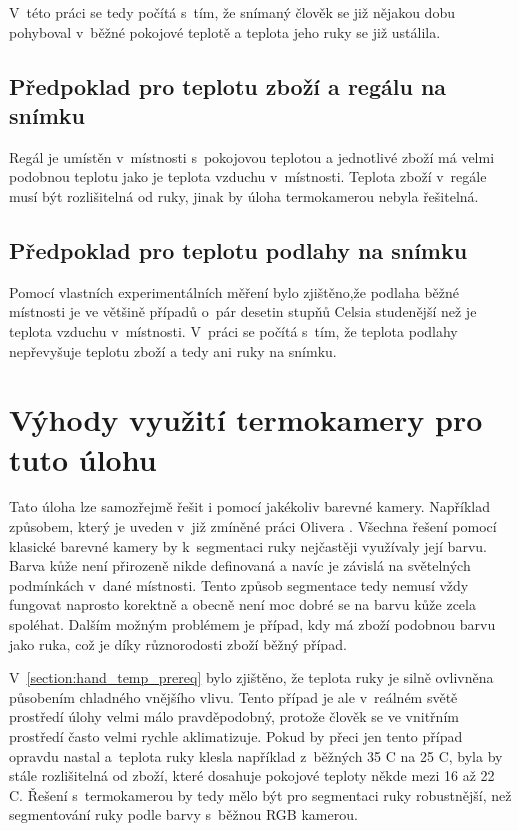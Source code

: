     V~této práci se tedy počítá s~tím, že snímaný člověk se již nějakou dobu pohyboval v~běžné pokojové teplotě a teplota jeho ruky se již ustálila.
    
    \subsection{Předpoklad pro teplotu zboží a regálu na snímku}
    Regál je umístěn v~místnosti s~pokojovou teplotou a jednotlivé zboží má velmi podobnou teplotu jako je teplota vzduchu v~místnosti. Teplota zboží v~regále musí být rozlišitelná od ruky, jinak by úloha termokamerou nebyla řešitelná.
    
    \subsection{Předpoklad pro teplotu podlahy na snímku}
    Pomocí vlastních experimentálních měření bylo zjištěno,že podlaha běžné místnosti je ve většině případů o~pár desetin stupňů Celsia studenější než je teplota vzduchu v~místnosti. V~práci se počítá s~tím, že teplota podlahy nepřevyšuje teplotu zboží a tedy ani ruky na snímku.
    
\section{Výhody využití termokamery pro tuto úlohu}
Tato úloha lze samozřejmě řešit i pomocí jakékoliv barevné kamery. Například způsobem, který je uveden v~již zmíněné práci Olivera \cite{kerul2016detekce}. Všechna řešení pomocí klasické barevné kamery by k~segmentaci ruky nejčastěji využívaly její barvu. Barva kůže není přirozeně nikde definovaná a navíc je závislá na světelných podmínkách v~dané místnosti. Tento způsob segmentace tedy nemusí vždy fungovat naprosto korektně a obecně není moc dobré se na barvu kůže zcela spoléhat. Dalším možným problémem je případ, kdy má zboží podobnou barvu jako ruka, což je díky různorodosti zboží běžný případ. 

V~\ref{section:hand_temp_prereq} bylo zjištěno, že teplota ruky je silně ovlivněna působením chladného vnějšího vlivu. Tento případ je ale v~reálném světě prostředí úlohy velmi málo pravděpodobný, protože člověk se ve vnitřním prostředí často velmi rychle aklimatizuje. Pokud by přeci jen tento případ opravdu nastal a~teplota ruky klesla například z~běžných 35 \textdegree{}C na 25 \textdegree{}C, byla by stále rozlišitelná od zboží, které dosahuje pokojové teploty někde mezi 16 až 22 \textdegree{}C. Řešení s~termokamerou by tedy mělo být pro segmentaci ruky robustnější, než segmentování ruky podle barvy s~běžnou RGB kamerou.

